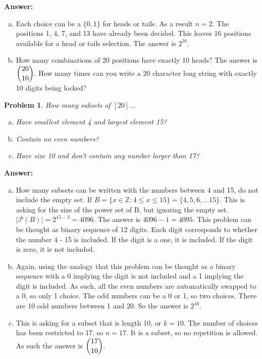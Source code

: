 \documentclass{article}
\theoremstyle{plain}
\newtheorem{problem}{Problem}
\newcommand{\ZZ}{\ensuremath{\mathbb Z}}
\begin{document}
\textbf{Answer:}
\begin{enumerate}[(a)]
    \item Each choice can be a $\{0, 1\}$ for heads or tails. As a result $n=2$. The positions 1, 4, 7, and 13 have already been decided. This leaves 16 positions available for a head or tails selection. The answer is $2^{16}$.
    \item How many combinations of 20 positions have exactly 10 heads? The answer is $\dbinom{20}{10}$. How many times can you write a 20 character long string with exactly 10 digits being locked?
\end{enumerate}


\setcounter{problem}{8}
\begin{problem} %
How many subsets of $[20] \dots$
\begin{enumerate}[(a)]
\item Have smallest element 4 and largest element 15?
\item Contain no even numbers?
\item Have size 10 and don't contain any number larger than 17?
\end{enumerate}
\end{problem}

\textbf{Answer:}
\begin{enumerate}[(a)]
    \item How many subsets can be written with the numbers between 4 and 15, do not include the empty set. If $B = \{x\in \ZZ: 4 \le x \le 15 \} = \{4, 5, 6, \dots 15\}$. This is asking for the size of the power set of B, but ignoring the empty set. $|\mathscr{P}(B)| = 2^{15-3} = 4096$. The answer is $4096-1 = 4095$. This problem can be thought as binary sequence of 12 digits. Each digit corresponds to whether the number 4 - 15 is included. If the digit is a one, it is included. If the digit is zero, it is not included.
    \item Again, using the analogy that this problem can be thought as a binary sequence with a 0 implying the digit is not included and a 1 implying the digit is included. As such, all the even numbers are automatically swapped to a 0, so only 1 choice. The odd numbers can be a 0 or 1, so two choices. There are 10 odd numbers between 1 and 20. So the answer is $2^{10}$.
    \item This is asking for a subset that is length 10, or $k = 10$. The number of choices has been restricted to 17, so $n=17$. It is a subset, so no repetition is allowed. As such the answer is $\dbinom{17}{10}$.
\end{enumerate}
\end{document}
